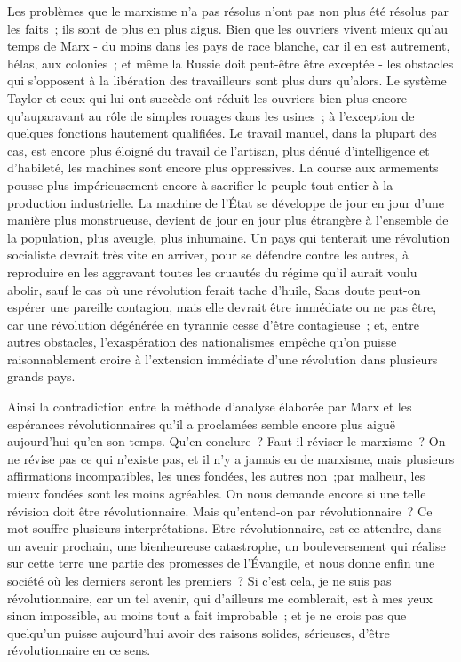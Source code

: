 \documentclass[french,twoside]{book} %
\begin{document}
Les problèmes que le marxisme n'a pas résolus n'ont pas non plus été résolus par les faits ; ils sont de plus en plus aigus. Bien que les ouvriers vivent mieux qu'au temps de Marx - du moins dans les pays de race blanche, car il en est autrement, hélas, aux colonies ; et même la Russie doit peut-être être exceptée - les obstacles qui s'opposent à la libération des travailleurs sont plus durs qu'alors. Le système Taylor et ceux qui lui ont succède ont réduit les ouvriers bien plus encore qu'auparavant au rôle de simples rouages dans les usines ; à l'exception de quelques fonctions hautement qualifiées. Le travail manuel, dans la plupart des cas, est encore plus éloigné du travail de l'artisan, plus dénué d'intelligence et d'habileté, les machines sont encore plus oppressives. La course aux armements pousse plus impérieusement encore à sacrifier le peuple tout entier à la production industrielle. La machine de l'État se développe de jour en jour d'une manière plus monstrueuse, devient de jour en jour plus étrangère à l'ensemble de la population, plus aveugle, plus inhumaine. Un pays qui tenterait une révolution socialiste devrait très vite en arriver, pour se défendre contre les autres, à reproduire en les aggravant toutes les cruautés du régime qu'il aurait voulu abolir, sauf le cas où une révolution ferait tache d'huile, Sans doute peut-on espérer une pareille contagion, mais elle devrait être immédiate ou ne pas être, car une révolution dégénérée en tyrannie cesse d'être contagieuse ; et, entre autres obstacles, l'exaspération des nationalismes empêche qu'on puisse raisonnablement croire à l'extension immédiate d'une révolution dans plusieurs grands pays.\par
Ainsi la contradiction entre la méthode d'analyse élaborée par Marx et les espérances révolutionnaires qu'il a proclamées semble encore plus aiguë aujourd'hui qu'en son temps. Qu'en conclure ? Faut-il réviser le marxisme ? On ne révise pas ce qui n'existe pas, et il n'y a jamais eu de marxisme, mais plusieurs affirmations incompatibles, les unes fondées, les autres non ;par malheur, les mieux fondées sont les moins agréables. On nous demande encore si une telle révision doit être révolutionnaire. Mais qu'entend-on par révolutionnaire ? Ce mot souffre plusieurs interprétations. Etre révolutionnaire, est-ce attendre, dans un avenir prochain, une bienheureuse catastrophe, un bouleversement qui réalise sur cette terre une partie des promesses de l'Évangile, et nous donne enfin une société où les derniers seront les premiers ? Si c'est cela, je ne suis pas révolutionnaire, car un tel avenir, qui d'ailleurs me comblerait, est à mes yeux sinon impossible, au moins tout a fait improbable ; et je ne crois pas que quelqu'un puisse aujourd'hui avoir des raisons solides, sérieuses, d'être révolutionnaire en ce sens.\par
\end{document}
